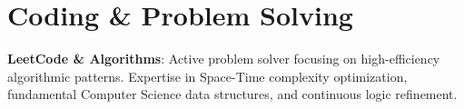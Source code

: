 \documentclass[letterpaper,11pt]{article}
\begin{document}
\section{Coding \& Problem Solving}
 \begin{itemize}[leftmargin=0.15in, label={}]
    \small{\item{
      \textbf{LeetCode \& Algorithms}{: Active problem solver focusing on high-efficiency algorithmic patterns. Expertise in Space-Time complexity optimization, fundamental Computer Science data structures, and continuous logic refinement.}
    }}
 \end{itemize}

\end{document}
